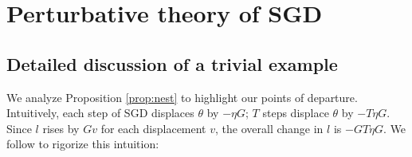 \documentclass[anon,12pt]{colt2021} %
\begin{document}
    \section{Perturbative theory of SGD}

        \subsection{Detailed discussion of a trivial example}\label{sect:exegesis}
            We analyze Proposition \ref{prop:nest} to highlight our points of
            departure.
            Intuitively, each step of SGD displaces $\theta$ by $-\eta G$;
            $T$ steps displace $\theta$ by $-T\eta G$.  Since $l$ rises by $Gv$
            for each displacement $v$, the overall change in $l$ is $-GT\eta
            G$.  We follow \cite{ne04,ro18} to rigorize this intuition:
\end{document}
